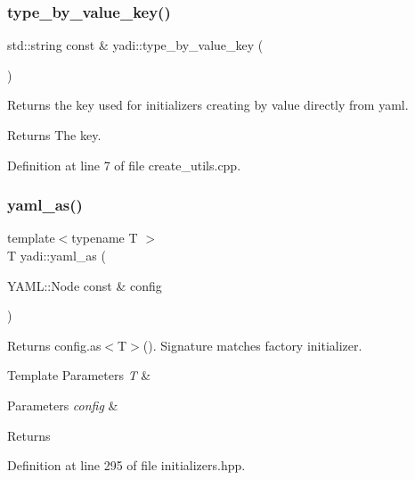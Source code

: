 \subsubsection{\texorpdfstring{type\+\_\+by\+\_\+value\+\_\+key()}{type\_by\_value\_key()}}
{\footnotesize\ttfamily std\+::string const  \& yadi\+::type\+\_\+by\+\_\+value\+\_\+key (\begin{DoxyParamCaption}{ }\end{DoxyParamCaption})}



Returns the key used for initializers creating by value directly from yaml. 

\begin{DoxyReturn}{Returns}
The key. 
\end{DoxyReturn}


Definition at line 7 of file create\+\_\+utils.\+cpp.

\mbox{\label{namespaceyadi_a8552ed4e9350993901558fb0db1e0906}} 
\subsubsection{\texorpdfstring{yaml\+\_\+as()}{yaml\_as()}}
{\footnotesize\ttfamily template$<$typename T $>$ \\
T yadi\+::yaml\+\_\+as (\begin{DoxyParamCaption}\item[{Y\+A\+M\+L\+::\+Node const \&}]{config }\end{DoxyParamCaption})}



Returns config.\+as$<$\+T$>$(). Signature matches factory initializer. 


\begin{DoxyTemplParams}{Template Parameters}
{\em T} & \\
\hline
\end{DoxyTemplParams}

\begin{DoxyParams}{Parameters}
{\em config} & \\
\hline
\end{DoxyParams}
\begin{DoxyReturn}{Returns}

\end{DoxyReturn}


Definition at line 295 of file initializers.\+hpp.

